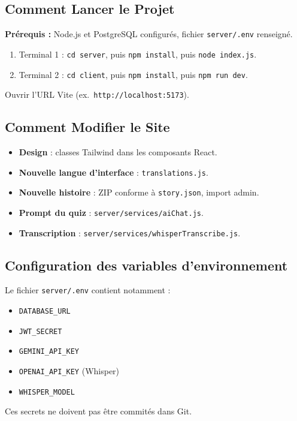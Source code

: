 \documentclass[12pt,twoside,letterpaper]{article}
\begin{document}
\subsection{Comment Lancer le Projet}

\textbf{Pr\'erequis :} Node.js et PostgreSQL configur\'es,
fichier \texttt{server/.env} renseign\'e.

\begin{enumerate}[leftmargin=*]
  \item Terminal 1 : \texttt{cd server}, puis \texttt{npm install}, puis \texttt{node index.js}.
  \item Terminal 2 : \texttt{cd client}, puis \texttt{npm install}, puis \texttt{npm run dev}.
\end{enumerate}

Ouvrir l'URL Vite (ex.\ \texttt{http://localhost:5173}).

\subsection{Comment Modifier le Site}

\begin{itemize}[leftmargin=*]
  \item \textbf{Design} : classes Tailwind dans les composants React.
  \item \textbf{Nouvelle langue d'interface} : \texttt{translations.js}.
  \item \textbf{Nouvelle histoire} : ZIP conforme \`a \texttt{story.json}, import admin.
  \item \textbf{Prompt du quiz} : \texttt{server/services/aiChat.js}.
  \item \textbf{Transcription} : \texttt{server/services/whisperTranscribe.js}.
\end{itemize}

\subsection{Configuration des variables d'environnement}

Le fichier \texttt{server/.env} contient notamment :
\begin{itemize}[leftmargin=*]
  \item \texttt{DATABASE\_URL}
  \item \texttt{JWT\_SECRET}
  \item \texttt{GEMINI\_API\_KEY}
  \item \texttt{OPENAI\_API\_KEY} (Whisper)
  \item \texttt{WHISPER\_MODEL}
\end{itemize}
Ces secrets ne doivent pas \^etre commit\'es dans Git.
\end{document}
